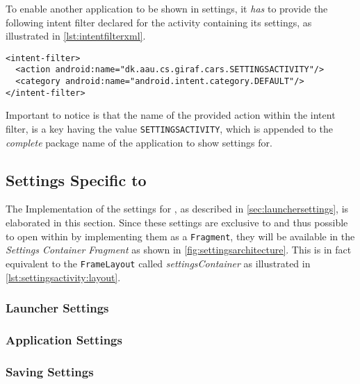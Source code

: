 To enable another \giraf application to be shown in settings, it \textit{has} to provide the following intent filter declared for the activity containing its settings, as illustrated in \cref{lst:intentfilterxml}.

\begin{lstlisting}[caption={The intent filter and action a \giraf application has to provide to be shown in settings.}, label={lst:intentfilterxml}]
<intent-filter>
  <action android:name="dk.aau.cs.giraf.cars.SETTINGSACTIVITY"/>
  <category android:name="android.intent.category.DEFAULT"/>
</intent-filter>
\end{lstlisting}

Important to notice is that the name of the provided action within the intent filter, is a key having the value \lstinline|SETTINGSACTIVITY|, which is appended to the \textit{complete} package name of the application to show settings for.

\subsection{Settings Specific to \launcher}
The Implementation of the settings for \launcher, as described in \cref{sec:launchersettings}, is elaborated in this section.
Since these settings are exclusive to \launcher and thus possible to open within \settingsactivity by implementing them as a \lstinline|Fragment|, they will be available in the \textit{Settings Container Fragment} as shown in \cref{fig:settingsarchitecture}.
This is in fact equivalent to the \lstinline|FrameLayout| called \textit{settingsContainer} as illustrated in \cref{lst:settingsactivity:layout}.


\subsubsection{Launcher Settings}


\subsubsection{Application Settings}


\subsubsection{Saving Settings}\label{para:sprint4:managingsettingsandroid}

